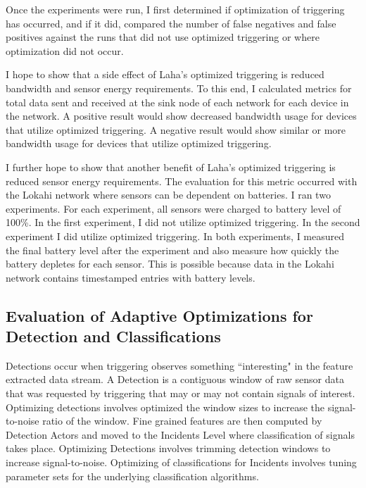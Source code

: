 Once the experiments were run, I first determined if optimization of triggering has occurred, and if it did, compared the number of false negatives and false positives against the runs that did not use optimized triggering or where optimization did not occur.

I hope to show that a side effect of Laha's optimized triggering is reduced bandwidth and sensor energy requirements. To this end, I calculated metrics for total data sent and received at the sink node of each network for each device in the network. A positive result would show decreased bandwidth usage for devices that utilize optimized triggering. A negative result would show similar or more bandwidth usage for devices that utilize optimized triggering.

I further hope to show that another benefit of Laha's optimized triggering is reduced sensor energy requirements. The evaluation for this metric occurred with the Lokahi network where sensors can be dependent on batteries. I ran two experiments. For each experiment, all sensors were charged to battery level of 100\%. In the first experiment, I did not utilize optimized triggering. In the second experiment I did utilize optimized triggering. In both experiments, I measured the final battery level after the experiment and also measure how quickly the battery depletes for each sensor. This is possible because data in the Lokahi network contains timestamped entries with battery levels.

\subsection{Evaluation of Adaptive Optimizations for Detection and Classifications}\label{subsec:evaluation-of-adaptive-optimizations-for-detection-and-classifications}
Detections occur when triggering observes something ``interesting" in the feature extracted data stream. A Detection is a contiguous window of raw sensor data that was requested by triggering that may or may not contain signals of interest. Optimizing detections involves optimized the window sizes to increase the signal-to-noise ratio of the window. Fine grained features are then computed by Detection Actors and moved to the Incidents Level where classification of signals takes place. Optimizing Detections involves trimming detection windows to increase signal-to-noise. Optimizing of classifications for Incidents involves tuning parameter sets for the underlying classification algorithms.

